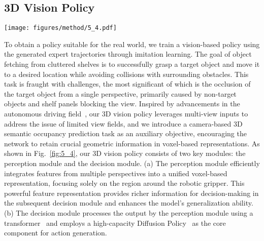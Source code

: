 
\subsection{3D Vision Policy}

\begin{figure*}[tb]
    \centering
    \texttt{[image: figures/method/5\_4.pdf]}
    \caption{ The \textbf{perception module} efficiently integrates features from multiple perspectives into a unified voxel-based representation, focusing solely on the region around the robotic gripper. The\textbf{ decision module} processes the output by the perception module using a transformer and employs a high-capacity Diffusion Policy as the core component for action generation.}
    \label{fig:5_4}
\end{figure*}

\label{3D-vision-policy}
To obtain a policy suitable for the real world, we train a vision-based policy using the generated expert trajectories through imitation learning.
The goal of object fetching from cluttered shelves is to successfully grasp a target object and move it to a desired location while avoiding collisions with surrounding obstacles. This task is fraught with challenges, the most significant of which is the occlusion of the target object from a single perspective, primarily caused by non-target objects and shelf panels blocking the view.
Inspired by advancements in the autonomous driving field~\cite{wang2024panoocc,cao2022monoscene,wei2023surroundocc}, our 3D vision policy leverages multi-view inputs to address the issue of limited view fields, and we introduce a camera-based 3D semantic occupancy prediction task as an auxiliary objective, encouraging the network to retain crucial geometric information in voxel-based representations. As shown in Fig.~\ref{fig:5_4}, our 3D vision policy consists of two key modules: the perception module and the decision module. (a) The perception module efficiently integrates features from multiple perspectives into a unified voxel-based representation, focusing solely on the region around the robotic gripper. This powerful feature representation provides richer information for decision-making in the subsequent decision module and enhances the model’s generalization ability. (b) The decision module processes the output by the perception module using a transformer~\cite{vaswani2017attention} and employs a high-capacity Diffusion Policy~\cite{chi2023diffusion} as the core component for action generation.



